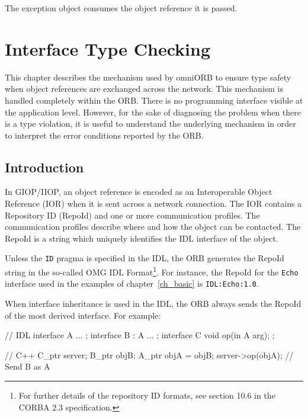 \documentclass[11pt,twoside,a4paper]{book}
\newcommand{\intf}[1]{\texttt{#1}}
\newcommand{\code}[1]{\texttt{#1}}
\begin{document}
\noindent The exception object consumes the object reference it is
passed.




\chapter{Interface Type Checking}
\label{ch_intf}

This chapter describes the mechanism used by omniORB to ensure type
safety when object references are exchanged across the network. This
mechanism is handled completely within the ORB. There is no
programming interface visible at the application level. However, for
the sake of diagnosing the problem when there is a type violation, it
is useful to understand the underlying mechanism in order to interpret
the error conditions reported by the ORB.

\section{Introduction}

In GIOP/IIOP, an object reference is encoded as an Interoperable
Object Reference (IOR) when it is sent across a network connection.
The IOR contains a Repository ID (RepoId) and one or more
communication profiles. The communication profiles describe where and
how the object can be contacted. The RepoId is a string which uniquely
identifies the IDL interface of the object.

Unless the \code{ID} pragma is specified in the IDL, the ORB generates
the RepoId string in the so-called OMG IDL Format\footnote{For further
details of the repository ID formats, see section 10.6 in the CORBA
2.3 specification.}. For instance, the RepoId for the \intf{Echo}
interface used in the examples of chapter~\ref{ch_basic} is
\texttt{IDL:Echo:1.0}.

When interface inheritance is used in the IDL, the ORB always sends the
RepoId of the most derived interface. For example:

\begin{idllisting}
   // IDL
   interface A {
     ...
   };
   interface B : A {
     ...
   };
   interface C {
      void op(in A arg);
   };
\end{idllisting}

\begin{cxxlisting}
   // C++
   C_ptr server;
   B_ptr objB;
   A_ptr objA = objB;
   server->op(objA);  // Send B as A
\end{cxxlisting}
\end{document}
